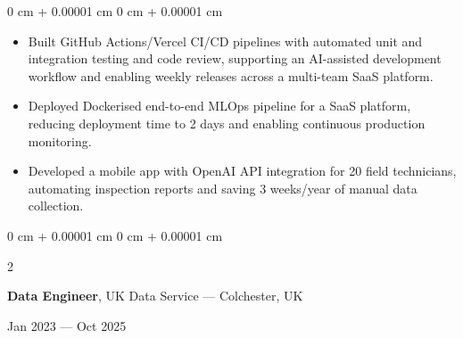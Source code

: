 \documentclass[6pt, letterpaper]{article}
\newenvironment{highlights}{
    \begin{itemize}[
        topsep=0.03 cm,
        parsep=0.03 cm,
        partopsep=0pt,
        itemsep=0pt,
        leftmargin=0 cm + 10pt
    ]
}{
    \end{itemize}
} %
\newenvironment{onecolentry}{
    \begin{adjustwidth}{
        0 cm + 0.00001 cm
    }{
        0 cm + 0.00001 cm
    }
}{
    \end{adjustwidth}
} %
\newenvironment{twocolentry}[2][]{
    \onecolentry
    \def\secondColumn{#2}
    \setcolumnwidth{\fill, 4.5 cm}
    \begin{paracol}{2}
}{
    \switchcolumn \raggedleft \secondColumn
    \end{paracol}
    \endonecolentry
} %
\begin{document}
        \begin{onecolentry}
        \begin{highlights}

            \item Built GitHub Actions/Vercel CI/CD pipelines with automated unit and integration testing and code review, supporting an AI-assisted development workflow and enabling weekly releases across a multi-team SaaS platform.
            \item Deployed Dockerised end-to-end MLOps pipeline for a SaaS platform, reducing deployment time to 2 days and enabling continuous production monitoring.
            \item Developed a mobile app with OpenAI API integration for 20 field technicians, automating inspection reports and saving 3 weeks/year of manual data collection.

        \end{highlights}
        \end{onecolentry}

        \begin{twocolentry}{Jan 2023 --- Oct 2025}
            \textbf{Data Engineer}, UK Data Service --- Colchester, UK
        \end{twocolentry}
\end{document}
